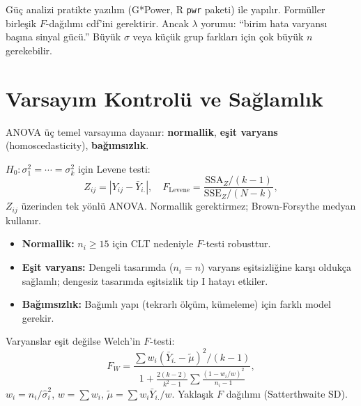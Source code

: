 \begin{ispatiskele}
Güç analizi pratikte yazılım (G*Power, R \texttt{pwr} paketi) ile yapılır. Formüller birleşik $F$-dağılımı cdf'ini gerektirir. Ancak $\lambda$ yorumu: ``birim hata varyansı başına sinyal gücü.'' Büyük $\sigma$ veya küçük grup farkları için çok büyük $n$ gerekebilir.
\end{ispatiskele}

\section{Varsayım Kontrolü ve Sağlamlık}
\label{sec:anova_varsayim}

ANOVA üç temel varsayıma dayanır: \textbf{normallik}, \textbf{eşit varyans} (homoscedasticity), \textbf{bağımsızlık}.

\begin{tanim}\label{def:levene}
$H_0:\sigma_1^2=\cdots=\sigma_k^2$ için Levene testi:
\[
  Z_{ij} = |Y_{ij} - \bar Y_{i.}|, \quad F_{\mathrm{Levene}} = \frac{\mathrm{SSA}_Z/(k-1)}{\mathrm{SSE}_Z/(N-k)},
\]
$Z_{ij}$ üzerinden tek yönlü ANOVA. Normallik gerektirmez; Brown-Forsythe medyan kullanır.
\end{tanim}

\begin{teorem}\label{thm:anova_sağlamlık}
\begin{itemize}
  \item \textbf{Normallik:} $n_i\geq15$ için CLT nedeniyle $F$-testi robusttur.
  \item \textbf{Eşit varyans:} Dengeli tasarımda ($n_i=n$) varyans eşitsizliğine karşı oldukça sağlamlı; dengesiz tasarımda eşitsizlik tip I hatayı etkiler.
  \item \textbf{Bağımsızlık:} Bağımlı yapı (tekrarlı ölçüm, kümeleme) için farklı model gerekir.
\end{itemize}
\end{teorem}

\begin{tanim}\label{def:welch_anova}
Varyanslar eşit değilse Welch'in $F$-testi:
\[
  F_W = \frac{\sum w_i(\bar Y_{i.}-\tilde\mu)^2/(k-1)}{1+\frac{2(k-2)}{k^2-1}\sum\frac{(1-w_i/w)^2}{n_i-1}},
\]
$w_i=n_i/\hat\sigma_i^2$, $w=\sum w_i$, $\tilde\mu=\sum w_i\bar Y_{i.}/w$. Yaklaşık $F$ dağılımı (Satterthwaite SD).
\end{tanim}

